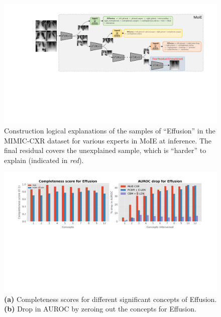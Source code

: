 \begin{figure}[h]
\centering
\includegraphics[width=1.0\textwidth]
{figures/Supp/mimic_concept_explanation.pdf}
\caption{Construction logical explanations of the samples of ``Effusion'' in the MIMIC-CXR dataset for various experts in MoIE at inference. The final residual covers the unexplained sample, which is ``harder'' to explain (indicated in \emph{red}).}
\label{fig:mimic_concept_explanation}
\end{figure}

\begin{figure}[h]
\centering
\includegraphics[width=1.0\textwidth]
{figures/Supp/mimic_concept_quant.pdf}
\caption{\textbf{(a)} Completeness scores for different significant concepts of Effusion.  \textbf{(b)} Drop in AUROC by zeroing out the concepts for Effusion.}
\label{fig:mimic_concept_quant}
\end{figure}

